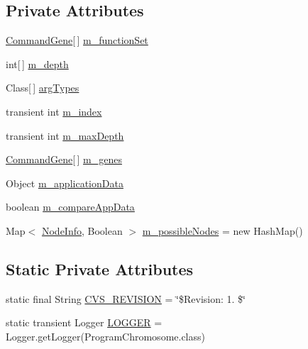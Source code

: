 \subsection*{Private Attributes}
\begin{DoxyCompactItemize}
\item 
\hyperlink{classorg_1_1jgap_1_1gp_1_1_command_gene}{Command\-Gene}\mbox{[}$\,$\mbox{]} \hyperlink{classorg_1_1jgap_1_1gp_1_1impl_1_1_program_chromosome_a9d7f024ebd3113416251c968d06dce6d}{m\-\_\-function\-Set}
\item 
int\mbox{[}$\,$\mbox{]} \hyperlink{classorg_1_1jgap_1_1gp_1_1impl_1_1_program_chromosome_a81e14f6750b10a0331646f6b1891f023}{m\-\_\-depth}
\item 
Class\mbox{[}$\,$\mbox{]} \hyperlink{classorg_1_1jgap_1_1gp_1_1impl_1_1_program_chromosome_a770064f02147733f5077b5b0bfa125fb}{arg\-Types}
\item 
transient int \hyperlink{classorg_1_1jgap_1_1gp_1_1impl_1_1_program_chromosome_a05a7b989fa9e7a7526b3c796bf033fe3}{m\-\_\-index}
\item 
transient int \hyperlink{classorg_1_1jgap_1_1gp_1_1impl_1_1_program_chromosome_add5812f1aa24a114aa44923db580b919}{m\-\_\-max\-Depth}
\item 
\hyperlink{classorg_1_1jgap_1_1gp_1_1_command_gene}{Command\-Gene}\mbox{[}$\,$\mbox{]} \hyperlink{classorg_1_1jgap_1_1gp_1_1impl_1_1_program_chromosome_ad3903410ad37a12a87ee51b4a3f4858a}{m\-\_\-genes}
\item 
Object \hyperlink{classorg_1_1jgap_1_1gp_1_1impl_1_1_program_chromosome_a918187c443c8cfb61eaa33a32801df64}{m\-\_\-application\-Data}
\item 
boolean \hyperlink{classorg_1_1jgap_1_1gp_1_1impl_1_1_program_chromosome_ad4256d733bf0188c9530d7826f1320d3}{m\-\_\-compare\-App\-Data}
\item 
Map$<$ \hyperlink{classorg_1_1jgap_1_1gp_1_1impl_1_1_program_chromosome_1_1_node_info}{Node\-Info}, Boolean $>$ \hyperlink{classorg_1_1jgap_1_1gp_1_1impl_1_1_program_chromosome_a42c376b973ad38ab97754447406a5480}{m\-\_\-possible\-Nodes} = new Hash\-Map()
\end{DoxyCompactItemize}
\subsection*{Static Private Attributes}
\begin{DoxyCompactItemize}
\item 
static final String \hyperlink{classorg_1_1jgap_1_1gp_1_1impl_1_1_program_chromosome_a1710d7febbb2e909bb1a9d41bba3aa17}{C\-V\-S\-\_\-\-R\-E\-V\-I\-S\-I\-O\-N} = \char`\"{}\$Revision\-: 1. \$\char`\"{}
\item 
static transient Logger \hyperlink{classorg_1_1jgap_1_1gp_1_1impl_1_1_program_chromosome_a0c09c5995d7929662288b0fc4d0b4858}{L\-O\-G\-G\-E\-R} = Logger.\-get\-Logger(Program\-Chromosome.\-class)
\end{DoxyCompactItemize}
